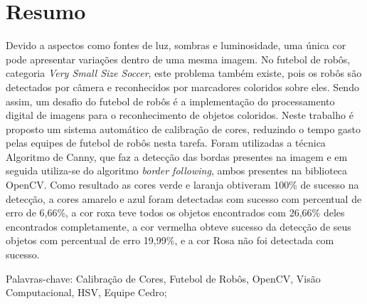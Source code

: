 
\chapter*{Resumo}

Devido a aspectos como fontes de luz, sombras e luminosidade, uma única cor pode apresentar variações dentro de uma mesma imagem. No futebol de robôs, categoria {\it Very Small Size Soccer}, este problema também existe, pois os robôs são detectados por câmera e reconhecidos por marcadores coloridos sobre eles. Sendo assim, um desafio do futebol de robôs é a implementação do processamento digital de imagens para o reconhecimento de objetos coloridos. Neste trabalho é proposto um sistema automático de calibração de cores, reduzindo o tempo gasto pelas equipes de futebol de robôs nesta tarefa. Foram utilizadas a técnica Algoritmo de Canny, que faz a detecção das bordas presentes na imagem e em seguida utiliza-se do algoritmo {\it border following}, ambos presentes na biblioteca OpenCV. Como resultado as cores verde e laranja obtiveram 100\% de sucesso na detecção, a cores amarelo e azul foram detectadas com sucesso com percentual de erro de 6,66\%, a cor roxa teve todos os objetos encontrados com 26,66\% deles encontrados completamente, a cor vermelha obteve sucesso da detecção de seus objetos com percentual de erro 19,99\%, e a cor Rosa não foi detectada com sucesso.


Palavras-chave: Calibração de Cores, Futebol de Robôs, OpenCV, Visão Computacional, HSV, Equipe Cedro;
